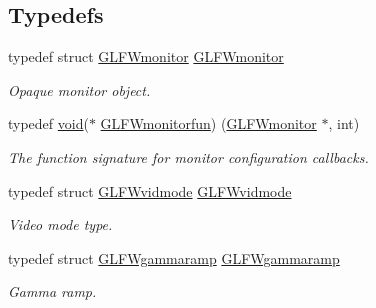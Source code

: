 \subsection*{Typedefs}
\begin{DoxyCompactItemize}
\item 
typedef struct \mbox{\hyperlink{group__monitor_ga8d9efd1cde9426692c73fe40437d0ae3}{G\+L\+F\+Wmonitor}} \mbox{\hyperlink{group__monitor_ga8d9efd1cde9426692c73fe40437d0ae3}{G\+L\+F\+Wmonitor}}
\begin{DoxyCompactList}\small\item\em Opaque monitor object. \end{DoxyCompactList}\item 
typedef \mbox{\hyperlink{glad_8h_a950fc91edb4504f62f1c577bf4727c29}{void}}($\ast$ \mbox{\hyperlink{group__monitor_ga8a7ee579a66720f24d656526f3e44c63}{G\+L\+F\+Wmonitorfun}}) (\mbox{\hyperlink{group__monitor_ga8d9efd1cde9426692c73fe40437d0ae3}{G\+L\+F\+Wmonitor}} $\ast$, int)
\begin{DoxyCompactList}\small\item\em The function signature for monitor configuration callbacks. \end{DoxyCompactList}\item 
typedef struct \mbox{\hyperlink{struct_g_l_f_wvidmode}{G\+L\+F\+Wvidmode}} \mbox{\hyperlink{group__monitor_gae48aadf4ea0967e6605c8f58fa5daccb}{G\+L\+F\+Wvidmode}}
\begin{DoxyCompactList}\small\item\em Video mode type. \end{DoxyCompactList}\item 
typedef struct \mbox{\hyperlink{struct_g_l_f_wgammaramp}{G\+L\+F\+Wgammaramp}} \mbox{\hyperlink{group__monitor_gaec0bd37af673be8813592849f13e02f0}{G\+L\+F\+Wgammaramp}}
\begin{DoxyCompactList}\small\item\em Gamma ramp. \end{DoxyCompactList}\end{DoxyCompactItemize}
